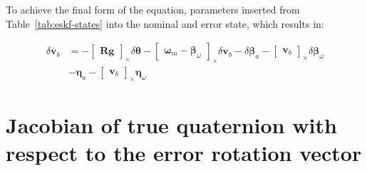 To achieve the final form of the equation, parameters inserted from Table~\ref{tab:eskf-states} into the nominal and error state, which results in:
\begin{tcolorbox}
\begin{equation}
\begin{aligned}
    \delta \dot{\mathbf{v}_b}&=-\begin{bmatrix}\mathbf{R}\mathbf{g}\end{bmatrix}_\times\delta\boldsymbol{\theta} -\begin{bmatrix}\boldsymbol{\omega}_m-\boldsymbol{\beta}_\omega\end{bmatrix}_\times\delta \mathbf{v}_b 
    -\delta\boldsymbol{\beta}_a-\begin{bmatrix}\mathbf{v}_b \end{bmatrix}_\times\delta\boldsymbol{\beta}_\omega \\ &
    -\boldsymbol{\eta}_{a}-\begin{bmatrix}\mathbf{v}_b \end{bmatrix}_\times\boldsymbol{\eta}_{\omega}
\end{aligned}
\end{equation}
\end{tcolorbox}

\section{Jacobian of true quaternion with respect to the error rotation vector}\label{app:der-true-quat-by-error-rotvec}

